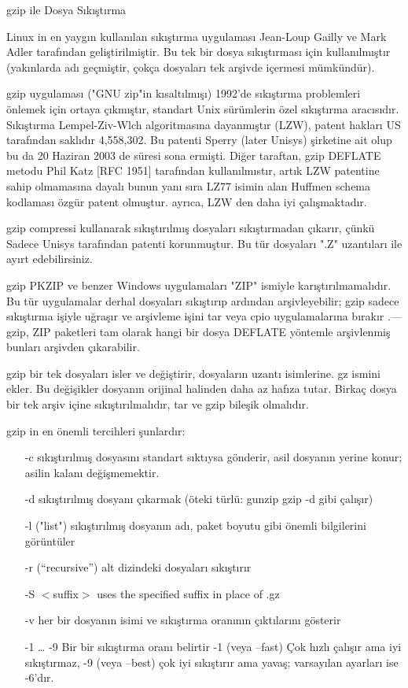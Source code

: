 \begin{section}{gzip ile Dosya Sıkıştırma}

Linux in en yaygın kullanılan sıkıştırma uygulaması Jean-Loup Gailly ve Mark Adler tarafından geliştirilmiştir. Bu tek bir dosya sıkıştırması için kullanılmıştır (yakınlarda adı geçmiştir, çokça dosyaları tek arşivde içermesi mümkündür).

gzip uygulaması ("GNU zip"in kısaltılmışı) 1992'de sıkıştırma problemleri önlemek için ortaya çıkmıştır, standart Unix sürümlerin özel sıkıştırma aracısıdır. Sıkıştırma Lempel-Ziv-Wlch algoritmasına dayanmıştır (LZW), patent hakları US tarafından saklıdır 4,558,302. Bu patenti Sperry (later Unisys) şirketine ait olup bu da 20 Haziran 2003 de süresi sona ermişti. Diğer taraftan, gzip DEFLATE metodu Phil Katz [RFC 1951] tarafından kullanılmıstır, artık LZW patentine sahip olmamasına dayalı bunun yanı sıra LZ77 isimin alan Huffmen schema kodlaması özgür patent olmuştur. ayrıca, LZW den daha iyi çalışmaktadır.

gzip compressi kullanarak sıkıştırılmış dosyaları sıkıştırmadan çıkarır, çünkü Sadece Unisys tarafından patenti korunmuştur. Bu tür dosyaları ".Z" uzantıları ile ayırt edebilirsiniz. 

gzip PKZIP ve benzer Windows uygulamaları "ZIP" ismiyle karıştırılmamalıdır. Bu tür uygulamalar derhal dosyaları sıkıştırıp ardından arşivleyebilir; gzip sadece sıkıştırma işiyle uğraşır ve arşivleme işini tar veya cpio uygulamalarına bırakır .—gzip, ZIP paketleri tam olarak hangi bir dosya DEFLATE yöntemle arşivlenmiş bunları arşivden çıkarabilir.

gzip bir tek dosyaları isler ve değiştirir, dosyaların uzantı isimlerine. gz ismini ekler. Bu değişikler dosyanın orijinal halinden daha az hafıza tutar. Birkaç dosya bir tek arşiv içine sıkıştırılmalıdır, tar ve gzip bileşik olmalıdır.

gzip in en önemli tercihleri şunlardır:
\begin{itemize}
\item[-c]sıkıştırılmış dosyasını standart sıktıysa gönderir, asil dosyanın yerine konur;
asilin kalanı değişmemektir.
\item[-d ]sıkıştırılmış dosyanı çıkarmak (öteki türlü: gunzip gzip -d gibi çalışır)
\item[-l ("list")]sıkıştırılmış dosyanın adı, paket boyutu gibi önemli bilgilerini görüntüler
\item[-r](“recursive”) alt dizindeki dosyaları sıkıştırır
\item[-S]$<$suffix$>$ uses the specified suffix in place of .gz
\item[-v]her bir dosyanın isimi ve sıkıştırma oranının çıktılarını gösterir
\item[-1 … -9]Bir bir sıkıştırma oranı belirtir -1 (veya --fast) Çok hızlı çalışır ama
iyi sıkıştırmaz, -9 (veya --best) çok iyi sıkıştırır ama yavaş; varsayılan ayarları ise -6'dır.
\end{itemize}


\end{section}
